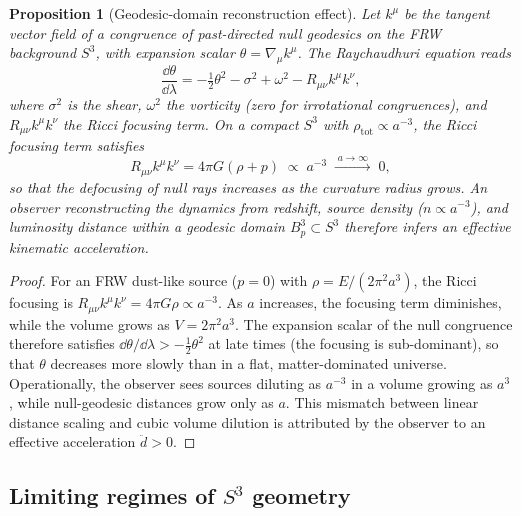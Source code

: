 \documentclass[12pt,a4paper]{article}
\theoremstyle{plain}
\newtheorem{proposition}[theorem]{Proposition}
\theoremstyle{definition}
\begin{document}
\begin{proposition}[Geodesic-domain reconstruction effect]
\label{prop:geodesic_reconstruction}
Let $k^\mu$ be the tangent vector field of a congruence of past-directed
null geodesics on the FRW background $S^3$, with expansion scalar
$\theta = \nabla_\mu k^\mu$.
The Raychaudhuri equation reads
\begin{equation}
  \frac{\dd\theta}{\dd\lambda}
  = -\tfrac{1}{2}\theta^2 - \sigma^2 + \omega^2
    - R_{\mu\nu}k^\mu k^\nu,
  \label{eq:raychaudhuri}
\end{equation}
where $\sigma^2$ is the shear, $\omega^2$ the vorticity (zero for
irrotational congruences), and $R_{\mu\nu}k^\mu k^\nu$ the Ricci
focusing term.
On a compact $S^3$ with $\rho_{\mathrm{tot}}\propto a^{-3}$, the Ricci
focusing term satisfies
\begin{equation}
  R_{\mu\nu}k^\mu k^\nu = 4\pi G(\rho + p) \;\propto\; a^{-3}
  \;\xrightarrow{\;a\to\infty\;}\; 0,
  \label{eq:ricci_focus}
\end{equation}
so that the defocusing of null rays increases as the curvature radius
grows. An observer reconstructing the dynamics from redshift, source
density ($n\propto a^{-3}$), and luminosity distance within a geodesic
domain $B^3_p\subset S^3$ therefore infers an effective kinematic
acceleration.
\end{proposition}

\begin{proof}
For an FRW dust-like source ($p=0$) with $\rho = E/(2\pi^2 a^3)$, the
Ricci focusing is $R_{\mu\nu}k^\mu k^\nu = 4\pi G\rho\propto a^{-3}$.
As $a$ increases, the focusing term diminishes, while the volume grows as
$V = 2\pi^2 a^3$.
The expansion scalar of the null congruence therefore satisfies
$\dd\theta/\dd\lambda > -\tfrac{1}{2}\theta^2$ at late times
(the focusing is sub-dominant), so that $\theta$ decreases more slowly
than in a flat, matter-dominated universe.
Operationally, the observer sees sources diluting as $a^{-3}$ in a volume
growing as $a^3$, while null-geodesic distances grow only as $a$.
This mismatch between linear distance scaling and cubic volume dilution is
attributed by the observer to an effective acceleration $\ddot d > 0$.
\end{proof}

\subsection{Limiting regimes of $S^3$ geometry}
\end{document}
